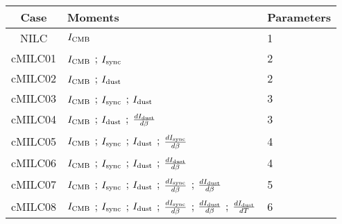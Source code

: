 \begin{tabular}{cll}
\toprule
    Case &                                                                                                                                               Moments &  Parameters \\
\midrule
 NILC &  $I_{\rm CMB}$ &  1 \\
 cMILC01 &  $I_{\rm CMB}$ ; $I_{\rm sync}$ &  2 \\
 cMILC02 &  $I_{\rm CMB}$ ; $I_{\rm dust}$ &  2 \\
 cMILC03 &  $I_{\rm CMB}$ ; $I_{\rm sync}$ ; $I_{\rm dust}$ &  3 \\
 cMILC04 &  $I_{\rm CMB}$ ; $I_{\rm dust}$ ; $\frac{d I_{\rm dust}}{d \beta}$ &  3 \\
 cMILC05 &  $I_{\rm CMB}$ ; $I_{\rm sync}$ ; $I_{\rm dust}$ ; $\frac{d I_{\rm sync}}{d \beta}$ &  4 \\
 cMILC06 &  $I_{\rm CMB}$ ; $I_{\rm sync}$ ; $I_{\rm dust}$ ; $\frac{d I_{\rm dust}}{d \beta}$ &  4 \\
 cMILC07 &  $I_{\rm CMB}$ ; $I_{\rm sync}$ ; $I_{\rm dust}$ ; $\frac{d I_{\rm sync}}{d \beta}$ ; $\frac{d I_{\rm dust}}{d \beta}$ &  5 \\
 cMILC08 &  $I_{\rm CMB}$ ; $I_{\rm sync}$ ; $I_{\rm dust}$ ; $\frac{d I_{\rm sync}}{d \beta}$ ; $\frac{d I_{\rm dust}}{d \beta}$ ; $\frac{d I_{\rm dust}}{d T}$ &  6 \\
\bottomrule
\end{tabular}
